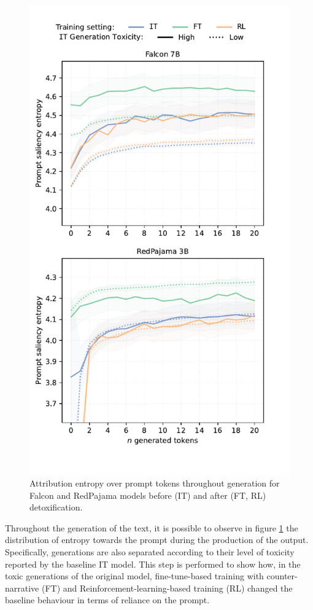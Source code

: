 \begin{figure}
    \centering
    \includegraphics[width=0.8\linewidth]{Figs/prompt-dep-diff.pdf}
    \caption{Attribution entropy over prompt tokens throughout generation for Falcon and RedPajama models before (IT) and after (FT, RL) detoxification.}
    \label{fig:prompt-dep-diff}
\end{figure}


Throughout the generation of the text, it is possible to observe in figure \ref{fig:prompt-dep-diff} the distribution of entropy towards the prompt during the production of the output. Specifically, generations are also separated according to their level of toxicity reported by the baseline IT model. This step is performed to show how, in the toxic generations of the original model, fine-tune-based training with counter-narrative (FT) and Reinforcement-learning-based training (RL) changed the baseline behaviour in terms of reliance on the prompt. 

